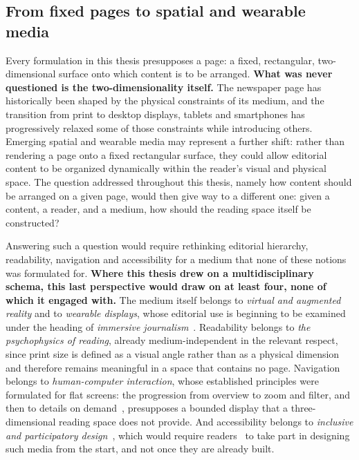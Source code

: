 \subsection{From fixed pages to spatial and wearable media}
\label{sec:perspectives-spatial}

Every formulation in this thesis presupposes a page: a fixed, rectangular, two-dimensional surface onto which content is to be arranged. \textbf{What was never questioned is the two-dimensionality itself.} 
The newspaper page has historically been shaped by the physical constraints of its medium, and the transition from print to desktop displays, tablets and smartphones has progressively relaxed some of those constraints while introducing others. Emerging spatial and wearable media may represent a further shift: rather than rendering a page onto a fixed rectangular surface, they could allow editorial content to be organized dynamically within the reader's visual and physical space. The question addressed throughout this thesis, namely how content should be arranged on a given page, would then give way to a different one: given a content, a reader, and a medium, how should the reading space itself be constructed?

Answering such a question would require rethinking editorial hierarchy, readability, navigation and accessibility for a medium that none of these notions was formulated for. \textbf{Where this thesis drew on a multidisciplinary schema, this last perspective would draw on at least four, none of which it engaged with.} The medium itself belongs to \emph{virtual and augmented reality} and to \emph{wearable displays}, whose editorial use is beginning to be examined under the heading of \emph{immersive journalism}~\cite{bujic-imx2023}.
Readability belongs to \emph{the psychophysics of reading}, already medium-independent in the relevant respect, since print size is defined as a visual angle rather than as a physical dimension~\cite{legge2006} and therefore remains meaningful in a space that contains no page. 
Navigation belongs to \emph{human-computer interaction}, whose established principles were formulated for flat screens: the progression from overview to zoom and filter, and then to details on demand~\cite{shneiderman1996}, presupposes a bounded display that a three-dimensional reading space does not provide.
And accessibility belongs to \emph{inclusive and participatory design}~\cite{langdon-inclusive-design-2014, schuler-participatory-design-1993, vatavu-imx2021}, which would require readers \LV\ to take part in designing such media from the start, and not once they are already built.

